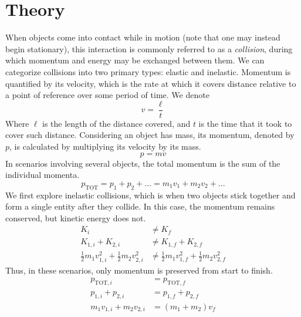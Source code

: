 \documentclass{report}
\begin{document}
    \section{Theory}
    \bigbreak \noindent 
    When objects come into contact while in motion (note that one may instead begin stationary), this interaction is commonly referred to as a \textit{collision}, during which momentum and energy may be exchanged between them. We can categorize collisions into two primary types: elastic and inelastic. 
    \bigbreak \noindent 
    Momentum is quantified by its velocity, which is the rate at which it covers distance relative to a point of reference over some period of time. We denote
    \begin{equation}
        v=\frac{\ell}{t}
    \end{equation}
    \bigbreak \noindent
    Where $\ell$ is the length of the distance covered, and $t$ is the time that it took to cover such distance.
    \bigbreak \noindent 
    Considering an object has mass, its momentum, denoted by $p$, is calculated by multiplying its velocity by its mass.
    \begin{equation}
        p=m v
    \end{equation}
    \bigbreak \noindent 
    In scenarios involving several objects, the total momentum is the sum of the individual momenta.
    \begin{equation}
        p_{\mathrm{TOT}}=p_1+p_2+\ldots=m_1 v_1+m_2 v_2+\ldots
    \end{equation}
    \bigbreak \noindent 
    We first explore inelastic collisions, which is when two objects stick together and form a single entity after they collide. In this case, the momentum remains conserved, but kinetic energy does not.
    \begin{equation}
        \begin{aligned}
            K_i & \neq K_f \\
            K_{1, i}+K_{2, i} & \neq K_{1, f}+K_{2, f} \\
            \frac{1}{2} m_1 v_{1, i}^2+\frac{1}{2} m_2 v_{2, i}^2 & \neq \frac{1}{2} m_1 v_{1, f}^2+\frac{1}{2} m_2 v_{2, f}^2
        \end{aligned}
    \end{equation}
    \bigbreak \noindent 
    Thus, in these scenarios, only momentum is preserved from start to finish.
    \begin{equation}
        \begin{aligned}
            p_{\mathrm{TOT}, i} & =p_{\mathrm{TOT}, f} \\
            p_{1, i}+p_{2, i} & =p_{1, f}+p_{2, f} \\
            m_1 v_{1, i}+m_2 v_{2, i} & =\left(m_1+m_2\right) v_f
        \end{aligned}
    \end{equation}
\end{document}
